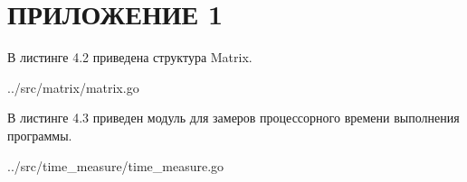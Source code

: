 \chapter*{ПРИЛОЖЕНИЕ 1}

В листинге 4.2 приведена структура Matrix.

\begin{lstinputlisting}[
	caption={Структура Matrix},
	label={lst:matrix},
	style={go},
	]{../src/matrix/matrix.go}
\end{lstinputlisting}

В листинге 4.3 приведен модуль для замеров процессорного времени выполнения программы.

\begin{lstinputlisting}[
	caption={Измерение времени},
	label={lst:time},
	style={go},
	]{../src/time\_measure/time\_measure.go}
\end{lstinputlisting}